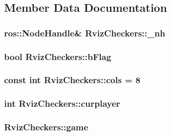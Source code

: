 \subsection{Member Data Documentation}
\hypertarget{structRvizCheckers_a60febb8e170bd5ce1b75b135a261a171}{
\subsubsection[{\-\_\-nh}]{\setlength{\rightskip}{0pt plus 5cm}ros\-::\-Node\-Handle\& Rviz\-Checkers\-::\-\_\-nh}}\label{structRvizCheckers_a60febb8e170bd5ce1b75b135a261a171}
\hypertarget{structRvizCheckers_a8539102352437ccaefc6622bb7dd81a0}{
\subsubsection[{b\-Flag}]{\setlength{\rightskip}{0pt plus 5cm}bool Rviz\-Checkers\-::b\-Flag}}\label{structRvizCheckers_a8539102352437ccaefc6622bb7dd81a0}
\hypertarget{structRvizCheckers_a6a307940a101dca088951df5050bf62d}{
\subsubsection[{cols}]{\setlength{\rightskip}{0pt plus 5cm}const int Rviz\-Checkers\-::cols = 8\hspace{0.3cm}{\ttfamily [static]}}}\label{structRvizCheckers_a6a307940a101dca088951df5050bf62d}
\hypertarget{structRvizCheckers_a69be787eb308ab029ecdb61a610af0c9}{
\subsubsection[{curplayer}]{\setlength{\rightskip}{0pt plus 5cm}int Rviz\-Checkers\-::curplayer}}\label{structRvizCheckers_a69be787eb308ab029ecdb61a610af0c9}
\hypertarget{structRvizCheckers_a2805fb89f64f767e601bdd3d381600fe}{
\subsubsection[{game}]{ Rviz\-Checkers\-::game}}\label{structRvizCheckers_a2805fb89f64f767e601bdd3d381600fe}
